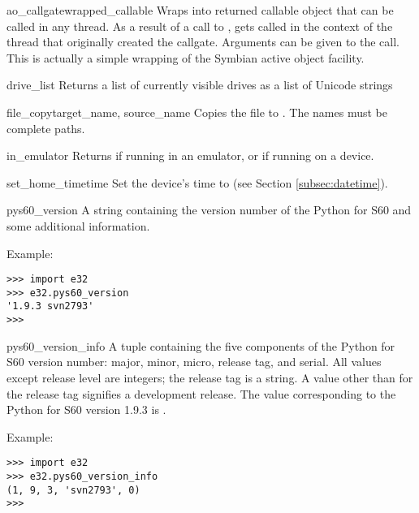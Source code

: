 \begin{funcdesc}{ao_callgate}{wrapped_callable}
Wraps  into returned callable object 
 that can be called in any thread. As a result of 
a call to ,  
gets called in the context of the thread that originally created the 
callgate. Arguments can be given to the call. This is actually a simple 
wrapping of the Symbian active object facility.
\end{funcdesc}

\begin{funcdesc}{drive_list}{}
Returns a list of currently visible drives as a list of Unicode strings 
\end{funcdesc}

\begin{funcdesc}{file_copy}{target_name, source_name}
Copies the file  to . The names must be 
complete paths.
\end{funcdesc}

\begin{funcdesc}{in_emulator}{}
Returns  if running in an emulator, or  if running on a 
device.
\end{funcdesc}

\begin{funcdesc}{set_home_time}{time}
Set the device's time to  (see Section \ref{subsec:datetime}).
\end{funcdesc}

\begin{datadesc}{pys60_version}
A string containing the version number of the Python for S60 and some 
additional information.

Example:
\begin{verbatim}
>>> import e32
>>> e32.pys60_version
'1.9.3 svn2793'
>>>
\end{verbatim}
\end{datadesc}

\begin{datadesc}{pys60_version_info}
A tuple containing the five components of the Python for S60 version
number: major, minor, micro, release tag, and serial. All values
except release level are integers; the release tag is a string. A
value other than  for the release tag signifies a
development release. The  value corresponding
to the Python for S60 version 1.9.3 is .

Example:
\begin{verbatim}
>>> import e32
>>> e32.pys60_version_info
(1, 9, 3, 'svn2793', 0)
>>>
\end{verbatim}
\end{datadesc}

